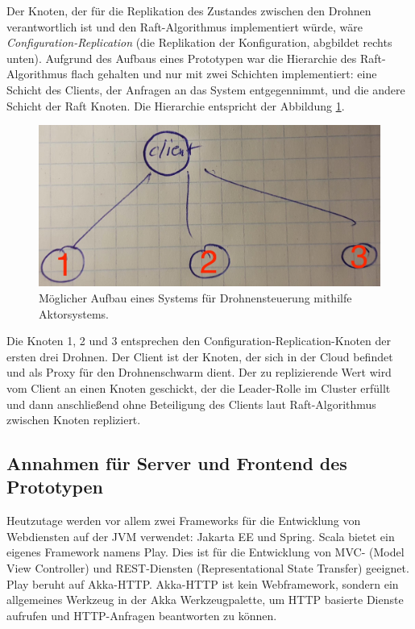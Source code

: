 Der Knoten, der für die Replikation des Zustandes zwischen den Drohnen verantwortlich ist und den Raft-Algorithmus implementiert würde, wäre \textit{Configuration-Replication} (die Replikation der Konfiguration, abgbildet rechts unten). Aufgrund des Aufbaus eines Prototypen war die Hierarchie des Raft-Algorithmus flach gehalten und nur mit zwei Schichten implementiert: eine Schicht des Clients, der Anfragen an das System entgegennimmt, und die andere Schicht der Raft Knoten. Die Hierarchie entspricht der Abbildung \ref{fig:hierarchy2}.

\begin{figure}
	\centering
	\includegraphics[width=0.7\linewidth]{images/6_hierarchy_2}
	\caption{Möglicher Aufbau eines Systems für Drohnensteuerung mithilfe Aktorsystems.}
	\label{fig:hierarchy2}
\end{figure}

Die Knoten 1, 2 und 3 entsprechen den Configuration-Replication-Knoten der ersten drei Drohnen. Der Client ist der Knoten, der sich in der Cloud befindet und als Proxy für den Drohnenschwarm dient. Der zu replizierende Wert wird vom Client an einen Knoten geschickt, der die Leader-Rolle im Cluster erfüllt und dann anschließend ohne Beteiligung des Clients laut Raft-Algorithmus zwischen Knoten repliziert.

\subsection{Annahmen für Server und Frontend des Prototypen}

Heutzutage werden vor allem zwei Frameworks für die Entwicklung von Webdiensten auf der JVM verwendet: Jakarta EE und Spring. Scala bietet ein eigenes Framework namens Play. Dies ist für die Entwicklung von  MVC- (Model View Controller) und REST-Diensten (Representational State Transfer) geeignet. Play beruht auf Akka-HTTP. Akka-HTTP ist kein Webframework, sondern ein allgemeines Werkzeug in der Akka Werkzeugpalette, um HTTP basierte Dienste aufrufen und HTTP-Anfragen beantworten zu können.

